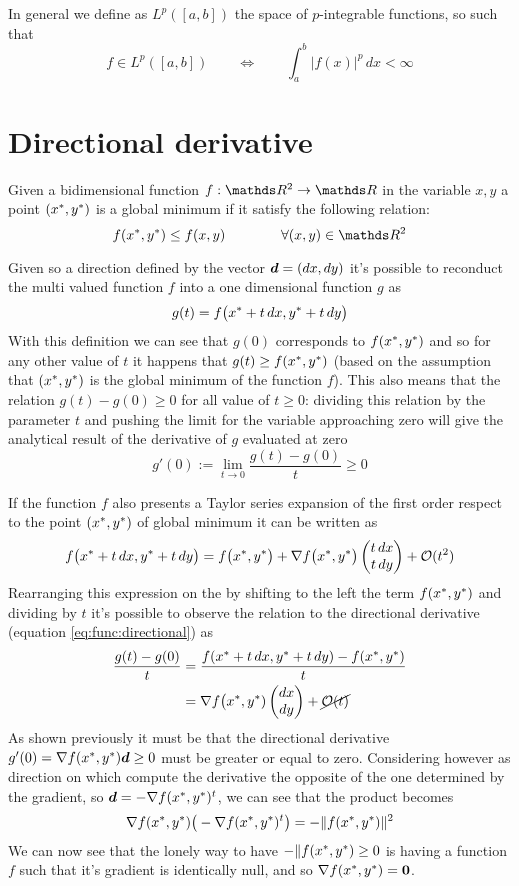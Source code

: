 	In general we define as $L^p([a,b])$ the space of $p$-integrable functions, so such that
	\[ f\in L^p([a,b])  \qquad \Leftrightarrow \qquad \int_a^b |f(x)|^p\, dx < \infty\]
	
	
\section{Directional derivative} 
	Given a bidimensional function $f:\R^2\rightarrow \R$ in the variable $x,y$ a point $(x^*,y^*)$ is a global minimum if it satisfy the following relation:
	\[ f(x\s,y\s) \leq f(x,y) \qquad \qquad \forall (x,y)\in \R^2 \]
	
	Given so a direction defined by the vector $\boldsymbol{d} = (dx,dy)$ it's possible to reconduct the multi valued function $f$ into a one dimensional function $g$ as
	\[ g(t) = f\big( x^* + t\, dx,y^* + t\, dy \big)  \]
	With this definition we can see that $g(0)$ corresponds to $f(x^*,y^*)$ and so for any other value of $t$ it happens that $g(t) \geq f(x^*,y^*)$ (based on the assumption that $(x^*,y^*)$ is the global minimum of the function $f$). This also means that the relation $g(t)-g(0) \geq 0$ for all value of $t \geq 0$: dividing this relation by the parameter $t$ and pushing the limit for the variable approaching zero will give the analytical result of the derivative of $g$ evaluated at zero
	\begin{equation} \label{eq:func:directional}
		g'(0) := \lim_{t\rightarrow 0} \frac{g(t) - g(0)}{t} \geq 0 
	\end{equation}
	
	If the function $f$ also presents a Taylor series expansion of the first order respect to the point $(x^*,y^*)$ of global minimum it can be written as
	\[ f\big( x^* + t\, dx, y^* +t \, dy\big) = f\big(x^*,y^*\big) +\nabla f\big(x^*,y^*\big) \begin{pmatrix} t \,dx \\ t\, dy \end{pmatrix} + \mathcal O(t^2) \]
	Rearranging this expression on the by shifting to the left the term $f(x^*,y^*)$ and dividing by $t$ it's possible to observe the relation to the directional derivative (equation \ref{eq:func:directional}) as
	\begin{align*}
		\frac{g(t)-g(0)}{t} & = \frac{f( x^* + t\, dx, y^* +t \, dy)  - f(x^*,y^*)}{t} \\
		& = \nabla f\big(x^*,y^*) \begin{pmatrix} dx \\ dy \end{pmatrix} + \cancel{\mathcal O(t)}
	\end{align*}
	As shown previously it must be that the directional derivative $g'(0) = \nabla f(x^*,y^*) \boldsymbol{d} \geq 0$ must be greater or equal to zero. Considering however as direction on which compute the derivative the opposite of the one determined by the gradient, so $\boldsymbol{d} = - \nabla f(x^* ,y^*)^t$, we can see that the product becomes
	\[ \nabla f(x^*,y^*) \big(-\nabla f(x^*,y^*)^t\big) = - \| f(x^*,y^*)\|^2 \]
	We can now see that the lonely way to have $-\|f(x^*,y^*)\geq 0$ is having a function $f$ such that it's gradient  is identically null, and so $\nabla f(x^*,y^*) = \boldsymbol{0}$.
	
